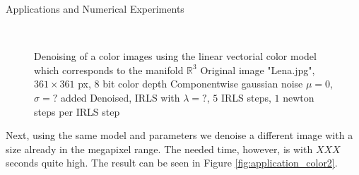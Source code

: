 \begin{chapter}{Applications and Numerical Experiments}
\begin{figure}[h!]
    \centering
    \\
    \caption[Color image "Lena" linear vectorial denoising]{Denoising of a color images using the linear vectorial color model which corresponds to the manifold $\mathbb{R}^3$
	 Original image "Lena.jpg", $361\times 361$ px, 8 bit color depth
	 Componentwise gaussian noise $\mu=0$, $\sigma=?$ added
	 Denoised, IRLS with $\lambda=?$, $5$ IRLS steps, $1$ newton steps per IRLS step
	\label{fig:application_color1}
    }
\end{figure}

Next, using the same model and parameters we denoise a different image with a size already in the megapixel range. The needed
time, however, is with $XXX$ seconds quite high. The result can be seen in Figure \ref{fig:application_color2}.\\


\end{chapter}
